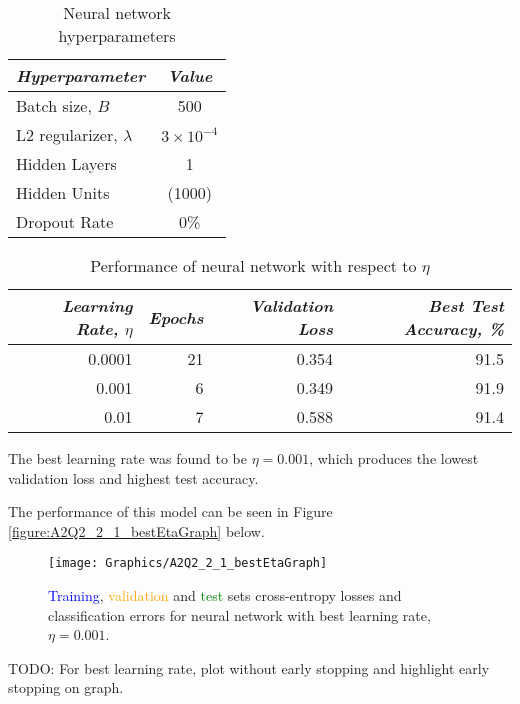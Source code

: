 \documentclass[a4paper,12pt]{article}
\begin{document}
\begin{table}[!htb]
\centering
\caption{Neural network hyperparameters}
\label{table:NN_HParam_2_2_2}
\vspace{0.5em}
\begin{tabular}{|l|c|} \hline
\textit{Hyperparameter} & \textit{Value} \\ \hline
Batch size, $B$ & 500 \\
L2 regularizer, $\lambda$ & $3 \times 10^{-4}$  \\
Hidden Layers & 1 \\
Hidden Units & (1000) \\
Dropout Rate & 0\% \\
\hline
\end{tabular}
\end{table}

\begin{table}[!htb]
\centering
\caption{Performance of neural network with respect to $\eta$}
\label{table:NN_LearningRate}
\vspace{0.5em}
\begin{tabular}{|r|r r r|} \hline
\textit{Learning Rate,} $\eta$ & \textit{Epochs} & \textit{Validation Loss} & \textit{Best Test Accuracy, \%} \\ \hline
0.0001 & 21 & 0.354 & 91.5 \\
0.001 & 6 & 0.349 & 91.9 \\
0.01 & 7 & 0.588 & 91.4 \\
\hline
\end{tabular}
\end{table}

The best learning rate was found to be $\eta = 0.001$, which produces the lowest validation loss and highest test accuracy.

The performance of this model can be seen in Figure \ref{figure:A2Q2_2_1_bestEtaGraph} below.

\begin{figure}[!htb]
\centering
\texttt{[image: Graphics/A2Q2\_2\_1\_bestEtaGraph]}
\caption{\label{figure:Softmax} \textcolor{blue}{Training}, \textcolor{orange}{validation} and \textcolor{green}{test} sets cross-entropy losses and classification errors for neural network with best learning rate, $\eta = 0.001$.}
\end{figure}

TODO: For best learning rate, plot without early stopping and highlight early stopping on graph.

\clearpage
\end{document}
